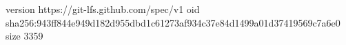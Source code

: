 version https://git-lfs.github.com/spec/v1
oid sha256:943ff844e949d182d955dbd1c61273af934c37e84d1499a01d37419569c7a6e0
size 3359
